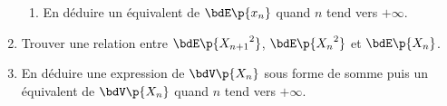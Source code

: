 \documentclass[a4paper,french,bookmarks]{article}
\begin{document}
\begin{enumerate}
\begin{enumerate}
            \item En déduire un équivalent de $\bdE\p{x_n}$ quand $n$ tend vers $+\infty$.
        \end{enumerate}
        
        \item Trouver une relation entre $\bdE\p{{X_{n+1}}^2}$, $\bdE\p{{X_n}^2}$ et $\bdE\p{X_n}$.
        
        \item En déduire une expression de $\bdV\p{X_n}$ sous forme de somme puis un équivalent de $\bdV\p{X_n}$ quand $n$ tend vers $+\infty$.
    \end{enumerate}
    
\end{document}
